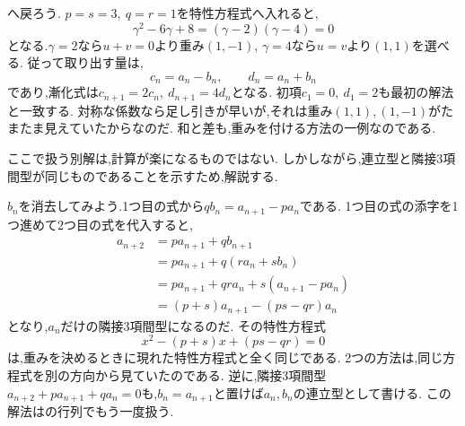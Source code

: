 \label{解釈：和と差は重みの一例}
へ戻ろう.
$p=s=3,\ q=r=1$を特性方程式へ入れると,
\[
  \gamma^2-6\gamma+8=(\gamma-2)(\gamma-4)=0
\]
となる.$\gamma=2$なら$u+v=0$より重み$(1,-1)$,
$\gamma=4$なら$u=v$より$(1,1)$を選べる.
従って取り出す量は,
\[
  c_n=a_n-b_n,\qquad d_n=a_n+b_n
\]
であり,漸化式は$c_{n+1}=2c_n,\ d_{n+1}=4d_n$となる.
初項$c_1=0,\ d_1=2$も最初の解法と一致する.
対称な係数なら足し引きが早いが,それは重み$(1,1),(1,-1)$がたまたま見えていたからなのだ.
和と差も,重みを付ける方法の一例なのである.

ここで扱う別解は,計算が楽になるものではない.
しかしながら,連立型と隣接3項間型が同じものであることを示すため,解説する.

$b_n$を消去してみよう.1つ目の式から$qb_n=a_{n+1}-pa_n$である.
1つ目の式の添字を1つ進めて2つ目の式を代入すると,
\begin{align*}
  a_{n+2}&=pa_{n+1}+qb_{n+1}\\
  &=pa_{n+1}+q(ra_n+sb_n)\\
  &=pa_{n+1}+qra_n+s(a_{n+1}-pa_n)\\
  &=(p+s)a_{n+1}-(ps-qr)a_n
\end{align*}
となり,$a_n$だけの隣接3項間型になるのだ.
その特性方程式
\[
  x^2-(p+s)x+(ps-qr)=0
\]
は,重みを決めるときに現れた特性方程式と全く同じである.
2つの方法は,同じ方程式を別の方向から見ていたのである.
逆に,隣接3項間型$a_{n+2}+pa_{n+1}+qa_n=0$も,$b_n=a_{n+1}$と置けば$a_n,b_n$の連立型として書ける.
この解法はの行列でもう一度扱う.
